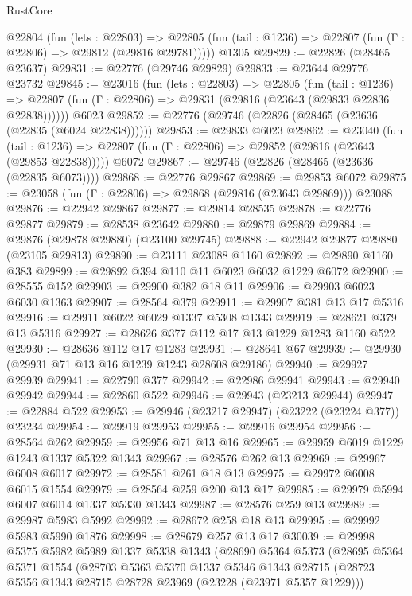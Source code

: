 \begin{lexlean}{RustCore}
\begin{coremodule}
    @22804
      (fun (lets : @22803) =>
      @22805 (fun (tail : @1236) => @22807 (fun (Γ : @22806) => @29812 (@29816 @29781)))))
    @1305
@29829 := @22826 (@28465 @23637)
@29831 := @22776 (@29746 @29829)
@29833 := @23644 @29776 @23732
@29845 := @23016
    (fun (lets : @22803) =>
    @22805
      (fun (tail : @1236) =>
      @22807 (fun (Γ : @22806) => @29831 (@29816 (@23643 (@29833 @22836 @22838))))))
    @6023
@29852 := @22776 (@29746 (@22826 (@28465 (@23636 (@22835 (@6024 @22838))))))
@29853 := @29833 @6023
@29862 := @23040
    (fun (tail : @1236) => @22807 (fun (Γ : @22806) => @29852 (@29816 (@23643 (@29853 @22838)))))
    @6072
@29867 := @29746 (@22826 (@28465 (@23636 (@22835 @6073))))
@29868 := @22776 @29867
@29869 := @29853 @6072
@29875 := @23058 (fun (Γ : @22806) => @29868 (@29816 (@23643 @29869))) @23088
@29876 := @22942 @29867
@29877 := @29814 @28535
@29878 := @22776 @29877
@29879 := @28538 @23642
@29880 := @29879 @29869
@29884 := @29876 (@29878 @29880) (@23100 @29745)
@29888 := @22942 @29877 @29880 (@23105 @29813)
@29890 := @23111 @23088 @1160
@29892 := @29890 @1160 @383
@29899 := @29892 @394 @110 @11 @6023 @6032 @1229 @6072
@29900 := @28555 @152
@29903 := @29900 @382 @18 @11
@29906 := @29903 @6023 @6030 @1363
@29907 := @28564 @379
@29911 := @29907 @381 @13 @17 @5316
@29916 := @29911 @6022 @6029 @1337 @5308 @1343
@29919 := @28621 @379 @13 @5316
@29927 := @28626 @377 @112 @17 @13 @1229 @1283 @1160 @522
@29930 := @28636 @112 @17 @1283
@29931 := @28641 @67
@29939 := @29930 (@29931 @71 @13 @16 @1239 @1243 @28608 @29186)
@29940 := @29927 @29939
@29941 := @22790 @377
@29942 := @22986 @29941
@29943 := @29940 @29942
@29944 := @22860 @522
@29946 := @29943 (@23213 @29944)
@29947 := @22884 @522
@29953 := @29946 (@23217 @29947) (@23222 (@23224 @377)) @23234
@29954 := @29919 @29953
@29955 := @29916 @29954
@29956 := @28564 @262
@29959 := @29956 @71 @13 @16
@29965 := @29959 @6019 @1229 @1243 @1337 @5322 @1343
@29967 := @28576 @262 @13
@29969 := @29967 @6008 @6017
@29972 := @28581 @261 @18 @13
@29975 := @29972 @6008 @6015 @1554
@29979 := @28564 @259 @200 @13 @17
@29985 := @29979 @5994 @6007 @6014 @1337 @5330 @1343
@29987 := @28576 @259 @13
@29989 := @29987 @5983 @5992
@29992 := @28672 @258 @18 @13
@29995 := @29992 @5983 @5990 @1876
@29998 := @28679 @257 @13 @17
@30039 := @29998
    @5375
    @5982
    @5989
    @1337
    @5338
    @1343
    (@28690
      @5364
      @5373
      (@28695
        @5364
        @5371
        @1554
        (@28703
          @5363
          @5370
          @1337
          @5346
          @1343
          @28715
          (@28723 @5356 @1343 @28715 @28728 @23969 (@23228 (@23971 @5357 @1229)))

\end{coremodule}
\end{lexlean}
